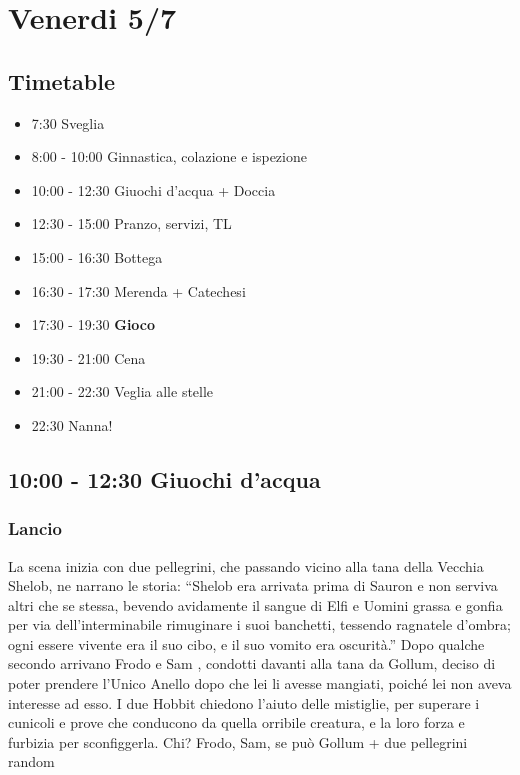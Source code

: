 \documentclass[../main.tex]{subfiles}
\begin{document}
   \section{Venerdi 5/7}
   \subsection{Timetable}
   \begin{itemize}
        \item 7:30 Sveglia
        \item 8:00 - 10:00 Ginnastica, colazione e ispezione
        \item 10:00 - 12:30 Giuochi d'acqua + Doccia
        \item 12:30 - 15:00 Pranzo, servizi, TL
        \item 15:00 - 16:30 Bottega
        \item 16:30 - 17:30 Merenda + Catechesi
        \item 17:30 - 19:30 \textbf{Gioco}
        \item 19:30 - 21:00 Cena
        \item 21:00 - 22:30 Veglia alle stelle
        \item 22:30 Nanna!
    \end{itemize}

   \subsection{10:00 - 12:30 Giuochi d'acqua}
       \subsubsection{Lancio}
       La scena inizia con due pellegrini, che passando vicino alla tana della Vecchia Shelob, ne narrano le
storia:
“Shelob era arrivata prima di Sauron e non serviva altri che se stessa, bevendo avidamente il sangue
di Elfi e Uomini grassa e gonfia per via dell'interminabile rimuginare i suoi banchetti, tessendo
ragnatele d'ombra; ogni essere vivente era il suo cibo, e il suo vomito era oscurità.”
Dopo qualche secondo arrivano Frodo e Sam , condotti davanti alla tana da Gollum, deciso di poter
prendere l'Unico Anello dopo che lei li avesse mangiati, poiché lei non aveva interesse ad esso. I
due Hobbit chiedono l'aiuto delle mistiglie, per superare i cunicoli e prove che conducono da quella
orribile creatura, e la loro forza e furbizia per sconfiggerla.
Chi? Frodo, Sam, se può Gollum + due pellegrini random
\end{document}
